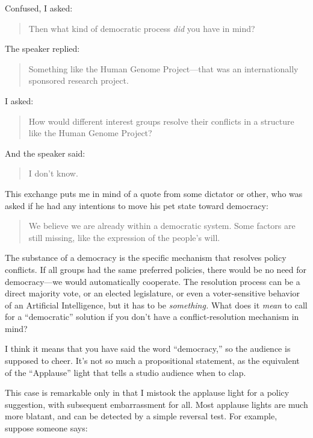 {
 Confused, I asked:}

\begin{quote}
{
 Then what kind of democratic process \textit{did} you have in
 mind?}
\end{quote}

{
 The speaker replied:}

\begin{quote}
{
 Something like the Human Genome Project---that was an
 internationally sponsored research project.}
\end{quote}

{
 I asked:}

\begin{quote}
{
 How would different interest groups resolve their conflicts in a
 structure like the Human Genome Project?}
\end{quote}

{
 And the speaker said:}

\begin{quote}
{
  I don't know.}
\end{quote}

{
 This exchange puts me in mind of a quote from some dictator or
other, who was asked if he had any intentions to move his pet state
toward democracy:}

\begin{quote}
{
 We believe we are already within a democratic system. Some factors
are still missing, like the expression of the people's
will.}
\end{quote}

{
 The substance of a democracy is the specific mechanism that
resolves policy conflicts. If all groups had the same preferred
policies, there would be no need for democracy---we would automatically
cooperate. The resolution process can be a direct majority vote, or an
elected legislature, or even a voter-sensitive behavior of an
Artificial Intelligence, but it has to be \textit{something.} What does
it \textit{mean} to call for a
``democratic'' solution if you
don't have a conflict-resolution mechanism in mind?}

{
 I think it means that you have said the word
``democracy,'' so the audience is
supposed to cheer. It's not so much a propositional
statement, as the equivalent of the
``Applause'' light that tells a
studio audience when to clap.}

{
 This case is remarkable only in that I mistook the applause light
for a policy suggestion, with subsequent embarrassment for all. Most
applause lights are much more blatant, and can be detected by a simple
reversal test. For example, suppose someone says:}

